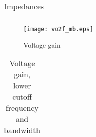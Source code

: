 \begin{table}[H]
  \centering
  \begin{tabular}{|c|c|}
    \hline
        
        \hline
  \end{tabular}
  \caption{Impedances}
  \label{tab:sim_imp_mb}
\end{table}

\begin{figure}[H]
\centering
\texttt{[image: vo2f\_mb.eps]}
\caption{Voltage gain}
\label{vg_mb}
\end{figure}

\begin{table}[H]
  \centering
  \begin{tabular}{|c|c|}
    \hline
        
        \hline
  \end{tabular}
  \caption{Voltage gain, lower cutoff frequency and bandwidth}
  \label{tab:res_sim_mb}
\end{table}
